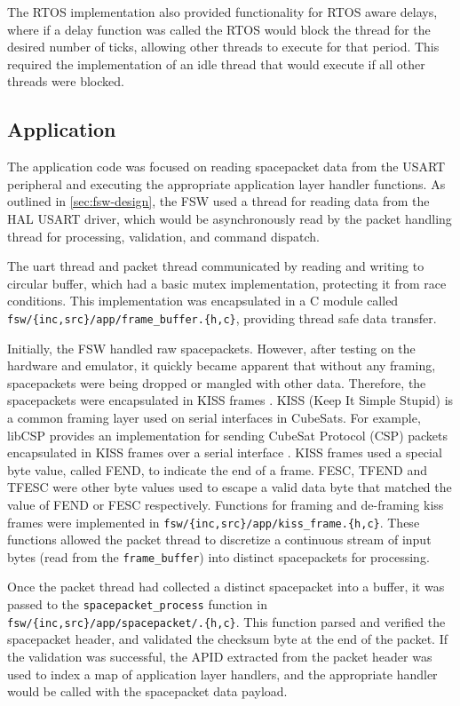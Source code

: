 \documentclass[../report.tex]{subfiles}
\begin{document}
The RTOS implementation also provided functionality for RTOS aware delays,
where if a delay function was called the RTOS would block the thread for the
desired number of ticks, allowing other threads to execute for that period.
This required the implementation of an idle thread that would execute if all
other threads were blocked.

\subsection{Application}

The application code was focused on reading spacepacket data from the USART
peripheral and executing the appropriate application layer handler functions.
As outlined in \autoref{sec:fsw-design}, the FSW used a thread for reading data
from the HAL USART driver, which would be asynchronously read by the packet
handling thread for processing, validation, and command dispatch.

The uart thread and packet thread communicated by reading and writing to
circular buffer, which had a basic mutex implementation, protecting it from
race conditions. This implementation was encapsulated in a C module called
\lstinline|fsw/{inc,src}/app/frame_buffer.{h,c}|, providing thread safe data
transfer.

Initially, the FSW handled raw spacepackets. However, after testing on the
hardware and emulator, it quickly became apparent that without any framing,
spacepackets were being dropped or mangled with other data. Therefore, the
spacepackets were encapsulated in KISS frames \citep{kiss}. KISS (Keep It
Simple Stupid) is a common framing layer used on serial interfaces in CubeSats.
For example, libCSP provides an implementation for sending CubeSat Protocol
(CSP) packets encapsulated in KISS frames over a serial interface
\citep{libCSP_kiss}. KISS frames used a special byte value, called FEND, to
indicate the end of a frame. FESC, TFEND and TFESC were other byte values used
to escape a valid data byte that matched the value of FEND or FESC
respectively. Functions for framing and de-framing kiss frames were implemented
in \lstinline|fsw/{inc,src}/app/kiss_frame.{h,c}|. These functions allowed the
packet thread to discretize a continuous stream of input bytes (read from the
\lstinline|frame_buffer|) into distinct spacepackets for processing.

Once the packet thread had collected a distinct spacepacket into a
buffer, it was passed to the \lstinline|spacepacket_process| function in
\lstinline|fsw/{inc,src}/app/spacepacket/.{h,c}|. This function parsed and
verified the spacepacket header, and validated the checksum byte at the end of
the packet. If the validation was successful, the APID extracted from the
packet header was used to index a map of application layer handlers, and the
appropriate handler would be called with the spacepacket data payload.
\end{document}
